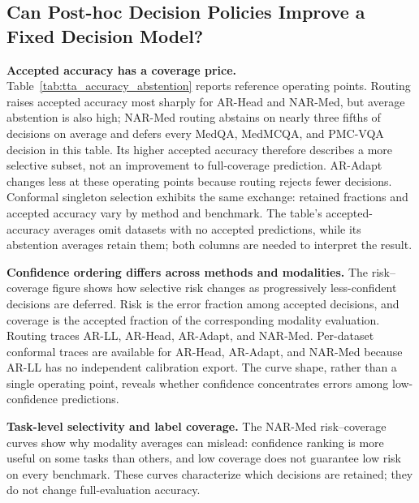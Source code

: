 \subsection{Can Post-hoc Decision Policies Improve a Fixed Decision Model?}
\label{sec:rq4}

\textbf{Accepted accuracy has a coverage price.} Table~\ref{tab:tta_accuracy_abstention} reports reference operating points. Routing raises accepted accuracy most sharply for AR-Head and NAR-Med, but average abstention is also high; NAR-Med routing abstains on nearly three fifths of decisions on average and defers every MedQA, MedMCQA, and PMC-VQA decision in this table. Its higher accepted accuracy therefore describes a more selective subset, not an improvement to full-coverage prediction. AR-Adapt changes less at these operating points because routing rejects fewer decisions. Conformal singleton selection exhibits the same exchange: retained fractions and accepted accuracy vary by method and benchmark. The table's accepted-accuracy averages omit datasets with no accepted predictions, while its abstention averages retain them; both columns are needed to interpret the result.

\textbf{Confidence ordering differs across methods and modalities.} The risk--coverage figure shows how selective risk changes as progressively less-confident decisions are deferred. Risk is the error fraction among accepted decisions, and coverage is the accepted fraction of the corresponding modality evaluation. Routing traces AR-LL, AR-Head, AR-Adapt, and NAR-Med. Per-dataset conformal traces are available for AR-Head, AR-Adapt, and NAR-Med because AR-LL has no independent calibration export. The curve shape, rather than a single operating point, reveals whether confidence concentrates errors among low-confidence predictions.

\textbf{Task-level selectivity and label coverage.} The NAR-Med risk--coverage curves show why modality averages can mislead: confidence ranking is more useful on some tasks than others, and low coverage does not guarantee low risk on every benchmark. These curves characterize which decisions are retained; they do not change full-evaluation accuracy.


